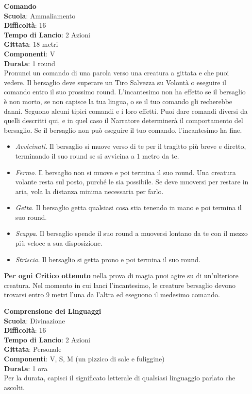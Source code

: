 \begin{multicols}{2}
\medskip\textbf{Comando}\\
\textbf{Scuola}: Ammaliamento\\
\textbf{Difficoltà}: 16\\
\textbf{Tempo di Lancio}: 2 Azioni\\
\textbf{Gittata}: 18 metri\\
\textbf{Componenti}: V\\
\textbf{Durata}: 1 round\\
Pronunci un comando di una parola verso una creatura a gittata e che puoi vedere. Il bersaglio deve superare un Tiro Salvezza su Volontà o eseguire il comando entro il suo prossimo round. L'incantesimo non ha effetto se il bersaglio è non morto, se non capisce la tua lingua, o se il tuo comando gli recherebbe danni. Seguono alcuni tipici comandi e i loro effetti. Puoi dare comandi diversi da quelli descritti qui, e in quel caso il Narratore determinerà il comportamento del bersaglio. Se il bersaglio non può eseguire il tuo comando, l'incantesimo ha fine.
\begin{itemize}
	\item 
\textit{Avvicinati}. Il bersaglio si muove verso di te per il tragitto più breve e diretto, terminando il suo round se si avvicina a 1 metro da te.
	\item 
\textit{Fermo}. Il bersaglio non si muove e poi termina il suo round. Una creatura volante resta sul posto, purché le sia possibile. Se deve muoversi per restare in aria, vola la distanza minima necessaria per farlo.
	\item 
	\textit{Getta}. Il bersaglio getta qualsiasi cosa stia tenendo in mano e poi termina il suo round. 	
	\item 
	\textit{Scappa}. Il bersaglio spende il suo round a muoversi lontano da te con il mezzo più veloce a sua disposizione.
	\item \textit{Striscia}. Il bersaglio si getta prono e poi termina il suo round.
\end{itemize}

\textbf{Per ogni Critico ottenuto} nella prova di magia puoi agire su di un'ulteriore creatura. Nel momento in cui lanci l'incantesimo, le creature bersaglio devono trovarsi entro 9 metri l'una da l'altra ed eseguono il medesimo comando.

\medskip\textbf{Comprensione dei Linguaggi}\\
\textbf{Scuola}: Divinazione\\
\textbf{Difficoltà}: 16\\
\textbf{Tempo di Lancio}: 2 Azioni\\
\textbf{Gittata}: Personale\\
\textbf{Componenti}: V, S, M (un pizzico di sale e fuliggine)\\
\textbf{Durata}: 1 ora\\
Per la durata, capisci il significato letterale di qualsiasi linguaggio parlato che ascolti.


\end{multicols}
